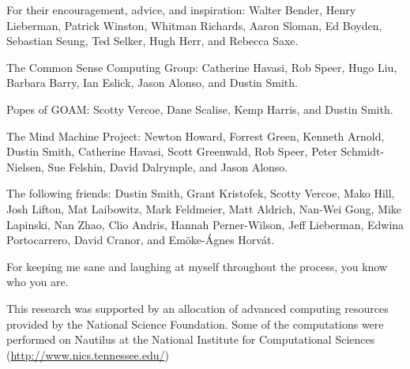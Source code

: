 \vspace{5mm}

\noindent For their encouragement, advice, and inspiration:
Walter Bender,
Henry Lieberman,
Patrick Winston,
Whitman Richards,
Aaron Sloman,
Ed Boyden,
Sebastian Seung,
Ted Selker,
Hugh Herr, and
Rebecca Saxe.

\vspace{5mm}

\noindent The Common Sense Computing Group:
Catherine Havasi,
Rob Speer,
Hugo Liu,
Barbara Barry,
Ian Eslick,
Jason Alonso, and
Dustin Smith.

\vspace{5mm}

\noindent Popes of GOAM:
Scotty Vercoe,
Dane Scalise,
Kemp Harris, and
Dustin Smith.

\vspace{5mm}

\noindent The Mind Machine Project:
Newton Howard, Forrest Green, Kenneth Arnold, Dustin Smith, Catherine Havasi, Scott Greenwald, Rob Speer, Peter Schmidt-Nielsen, Sue Felshin, David Dalrymple, and Jason Alonso.

\vspace{5mm}

\noindent
The following friends:
Dustin Smith, %
Grant Kristofek, %
Scotty Vercoe,
Mako Hill, %
Josh Lifton, %
Mat Laibowitz, %
Mark Feldmeier, %
Matt Aldrich, %
Nan-Wei Gong, %
Mike Lapinski, %
Nan Zhao, %
Clio Andris, %
Hannah Perner-Wilson, %
Jeff Lieberman, %
Edwina Portocarrero, %
David Cranor, and %
Em\"{o}ke-\'{A}gnes Horv\'{a}t. %

\vspace{5mm}

\noindent
For keeping me sane and laughing at myself throughout the process, you
know who you are.

\vspace{5mm}

\noindent
This research was supported by an allocation of advanced computing
resources provided by the National Science Foundation.  Some of the
computations were performed on Nautilus at the National Institute for
Computational Sciences (\url{http://www.nics.tennessee.edu/})

\endgroup


